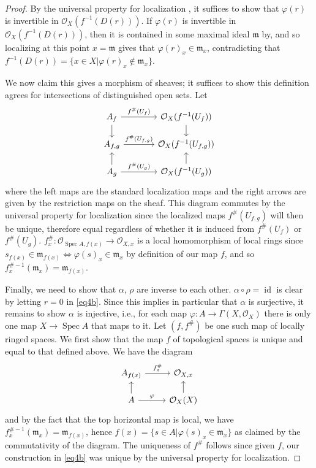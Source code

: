 \documentclass[12pt,letterpaper]{article}
\theoremstyle{definition}
\theoremstyle{remark}
\numberwithin{equation}{section}
\numberwithin{figure}{problem}
\DeclareMathOperator{\Spec}{Spec}
\DeclareMathOperator{\id}{id}
\newcommand{\OO}{\mathcal{O}}
\begin{document}
\begin{proof}
  By the universal property for localization \cite[Prop.~3.1]{AM69}, it suffices to show that $\varphi(r)$ is invertible in $\mathcal{O}_X(f^{-1}(D(r)))$. If $\varphi(r)$ is invertible in $\OO_X(f^{-1}(D(r)))$, then it is contained in some maximal ideal $\mathfrak{m}$ by, and so localizing at this point $x = \mathfrak{m}$ gives that $\varphi(r)_x \in \mathfrak{m}_x$, contradicting that $f^{-1}(D(r)) = \{x \in X \vert \varphi(r)_x \notin \mathfrak{m}_x\}$.
  \par We now claim this gives a morphism of sheaves; it suffices to show this definition agrees for intersections of distinguished open sets. Let
  \begin{equation*}
    \begin{tikzcd}[column sep=large,row sep=scriptsize]
      A_f \rar{f^\#(U_f)}\dar & \OO_X(f^{-1}(U_f))\dar\\
      A_{f,g} \rar{f^\#(U_{f,g})} & \OO_X(f^{-1}(U_{f,g}))\\
      A_g \rar{f^\#(U_g)}\uar & \OO_X(f^{-1}(U_g))\uar
    \end{tikzcd}
  \end{equation*}
  where the left maps are the standard localization maps and the right arrows are given by the restriction maps on the sheaf. This diagram commutes by the universal property for localization since the localized maps $f^\#(U_{f,g})$ will then be unique, therefore equal regardless of whether it is induced from $f^\#(U_f)$ or $f^\#(U_g)$. $f^\#_x \colon \OO_{\Spec A,f(x)} \to \OO_{X,x}$ is a local homomorphism of local rings since $s_{f(x)} \in \mathfrak{m}_{f(x)} \iff \varphi(s)_x \in \mathfrak{m}_x$ by definition of our map $f$, and so $f_x^{\#-1}(\mathfrak{m}_x) = \mathfrak{m}_{f(x)}$.
  \par Finally, we need to show that $\alpha$, $\rho$ are inverse to each other. $\alpha \circ \rho = \id$ is clear by letting $r=0$ in \eqref{eq4b}. Since this implies in particular that $\alpha$ is surjective, it remains to show $\alpha$ is injective, i.e., for each map $\varphi\colon A \to \Gamma(X,\OO_X)$ there is only one map $X \to \Spec A$ that maps to it. Let $(f,f^\#)$ be one such map of locally ringed spaces. We first show that the map $f$ of topological spaces is unique and equal to that defined above. We have the diagram
  \begin{equation*}
    \begin{tikzcd}[row sep=scriptsize]
      A_{f(x)} \rar{f^\#_x} & \OO_{X,x}\\
      A \uar \rar{\varphi} & \OO_X(X) \uar
    \end{tikzcd}
  \end{equation*}
  and by the fact that the top horizontal map is local, we have $f^{\#-1}_x(\mathfrak{m}_x) = \mathfrak{m}_{f(x)}$, hence $f(x) = \{s \in A \vert \varphi(s)_x \in \mathfrak{m}_x\}$ as claimed by the commutativity of the diagram. The uniqueness of $f^\#$ follows since given $f$, our construction in \eqref{eq4b} was unique by the universal property for localization.
\end{proof}
\end{document}

